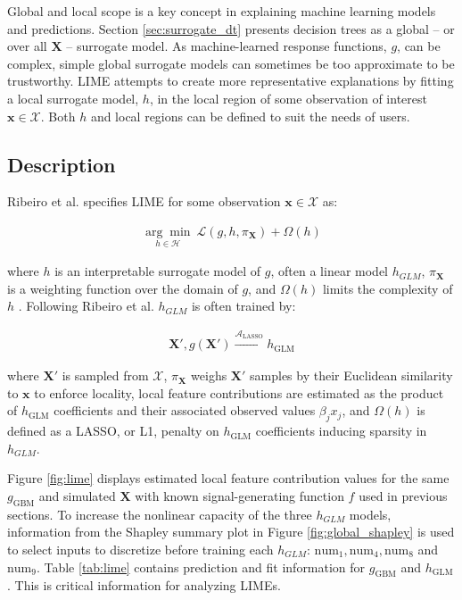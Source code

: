 \documentclass[11pt]{asaproc}
\begin{document}
Global and local scope is a key concept in explaining machine learning models and predictions. Section \ref{sec:surrogate_dt} presents decision trees as a global -- or over all $\mathbf{X}$ -- surrogate model. As machine-learned response functions, $g$, can be complex, simple global surrogate models can sometimes be too approximate to be trustworthy. LIME attempts to create more representative explanations by fitting a local surrogate model, $h$, in the local region of some observation of interest $\mathbf{x} \in \mathcal{X}$. Both $h$ and local regions can be defined to suit the needs of users.

\subsection{Description}

Ribeiro et al. specifies LIME for some observation $\mathbf{x} \in \mathcal{X}$ as:

\begin{equation}
\begin{aligned}
\underset{h \in \mathcal{H}}{\arg\min}\:\mathcal{L}(g, h, \pi_{\mathbf{X}}) + \Omega(h)
\end{aligned}
\end{equation}

\noindent where $h$ is an interpretable surrogate model of $g$, often a linear model $h_{GLM}$, $\pi_{\mathbf{X}}$ is a weighting function over the domain of $g$, and $\Omega(h)$ limits the complexity of $h$ \cite{lime}. Following Ribeiro et al. $h_{GLM}$ is often trained by:

\begin{equation}
\begin{aligned}
\mathbf{X}', g(\mathbf{X}') \xrightarrow{\mathcal{A}_{\text{LASSO}}} h_{\text{GLM}}
\end{aligned}
\end{equation}

\noindent where $\mathbf{X}'$ is sampled from $\mathcal{X}$, $\pi_{\mathbf{X}}$ weighs $\mathbf{X}'$ samples by their Euclidean similarity to $\mathbf{x}$ to enforce locality, local feature contributions are estimated as the product of $h_{\text{GLM}}$ coefficients and their associated observed values $\beta_j x_j$, and $\Omega(h)$ is defined as a LASSO, or L1, penalty on $h_{\text{GLM}}$ coefficients inducing sparsity in $h_{GLM}$. 		

Figure \ref{fig:lime} displays estimated local feature contribution values for the same $g_{\text{GBM}}$ and simulated $\mathbf{X}$ with known signal-generating function $f$ used in previous sections. To increase the nonlinear capacity of the three $h_{GLM}$ models, information from the Shapley summary plot in Figure \ref{fig:global_shapley} is used to select inputs to discretize before training each $h_{GLM}$: $\text{num}_1, \text{num}_4, \text{num}_8$ and $\text{num}_9$. Table \ref{tab:lime} contains prediction and fit information for $g_{\text{GBM}}$ and $h_{\text{GLM}}$. This is critical information for analyzing LIMEs.
\end{document}
